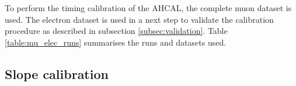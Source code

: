 \documentclass[twoside,a4paper,11pt]{article}
\begin{document}
To perform the timing calibration of the AHCAL, the complete muon dataset is used. The electron dataset is used in a next step to validate the calibration procedure as described in subsection \ref{subsec:validation}. Table \ref{table:mu_elec_runs} summarises the runs and datasets used.
\begin{table}[htbp]
\centering
{}
  \caption{Table with the statistic before and after selection used for timing calibration.}
  \label{table:mu_elec_runs}
\end{table}

\subsection{Slope calibration}
\label{subsec:slope_calib}
\end{document}
